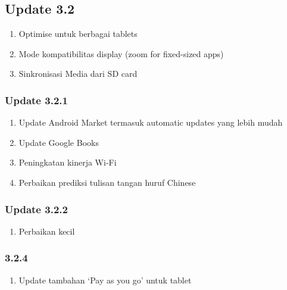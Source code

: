 \begin{enumerate}
\subsection{Update 3.2}
\begin{enumerate}
\item Optimise untuk berbagai tablets
\item Mode kompatibilitas display  (zoom for fixed-sized apps)
\item Sinkronisasi Media dari SD card
\end{enumerate}
\subsubsection{Update 3.2.1}
\begin{enumerate}
\item Update Android Market termasuk automatic updates yang lebih mudah
\item Update Google Books
\item Peningkatan kinerja Wi-Fi
\item Perbaikan prediksi tulisan tangan huruf Chinese
\end{enumerate}
\subsubsection{Update 3.2.2}
\begin{enumerate}
\item Perbaikan kecil
\end{enumerate}
\subsubsection{3.2.4}
\begin{enumerate}
\item Update tambahan ‘Pay as you go’ untuk tablet
\end{enumerate}

\end{enumerate}
